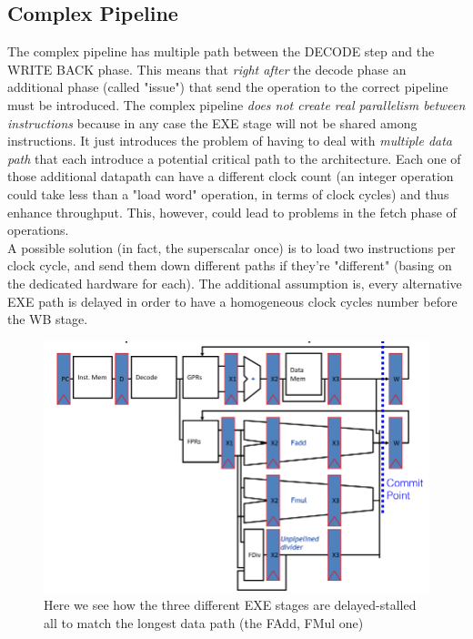 \documentclass[10pt,a4paper]{article}
\begin{document}
			\subsection{Complex Pipeline}
				The complex pipeline has multiple path between the DECODE step and the WRITE BACK phase. This means that \emph{right after} the decode phase an additional phase (called "issue") that send the operation to the correct pipeline must be introduced. The complex pipeline \emph{does not create real parallelism between instructions} because in any case the EXE stage will not be shared among instructions. It just introduces the problem of having to deal with \emph{multiple data path} that each introduce a potential critical path to the architecture. Each one of those additional datapath can have a different clock count (an integer operation could take less than a "load word" operation, in terms of clock cycles) and thus enhance throughput. This, however, could lead to problems in the fetch phase of operations.\\
				A possible solution (in fact, the superscalar once) is to load two instructions per clock cycle, and send them down different paths if they're "different" (basing on the dedicated hardware for each). The additional assumption is, every alternative EXE path is delayed in order to have a homogeneous clock cycles number before the WB stage.
				\begin{figure}[H]
					\centering
					\includegraphics[width = \textwidth]{./images/complexPipeline.png}
					\caption{Here we see how the three different EXE stages are delayed-stalled all to match the longest data path (the FAdd, FMul one)}
				\end{figure}
				
\end{document}
